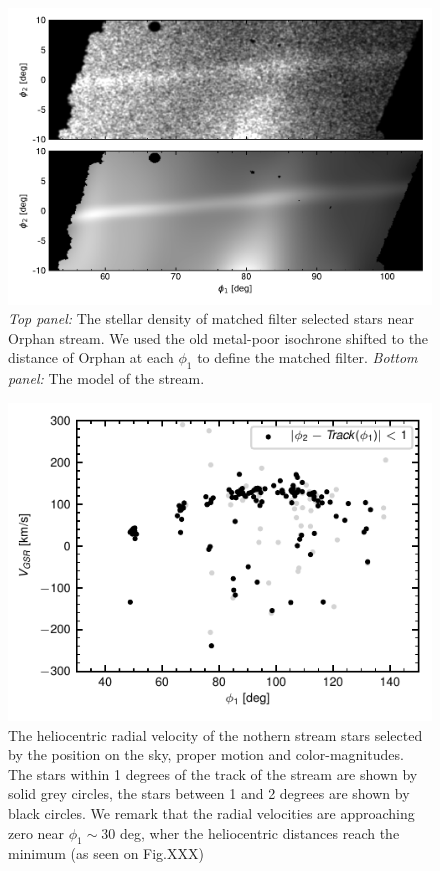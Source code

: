 \documentclass[a4paper,useAMS,usenatbib]{mnras}
\begin{document}
\begin{figure}
\includegraphics{decals_map.pdf}
\caption{{\it Top panel:} The stellar density of matched filter selected stars near Orphan stream. We used the old metal-poor isochrone
shifted to the distance of Orphan at each $\phi_1$ to define the matched filter. {\it Bottom panel:} The model of the stream.}
\end{figure}
\begin{figure}
\includegraphics{orphan_spec.pdf}
\caption{The heliocentric radial velocity of the nothern stream stars selected by the position on the sky, proper motion and color-magnitudes.
The stars within 1 degrees of the track of the stream are shown by solid grey circles, the stars between 1 and 2 degrees are shown 
by black circles. We remark that the radial velocities are approaching zero near $\phi_1 \sim 30 $ deg, wher the heliocentric distances 
reach the minimum (as seen on Fig.XXX)}
\end{figure}
\end{document}
